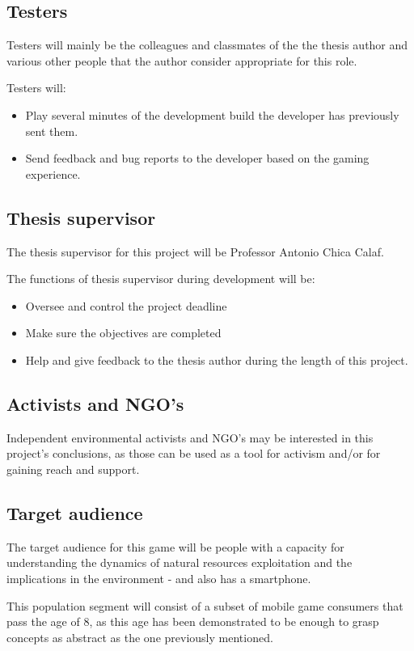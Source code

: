 \subsection{Testers}

Testers will mainly be the colleagues and classmates of the the thesis author and various other people that the author consider appropriate for this role.

Testers will:

\begin{itemize}
\item Play several minutes of the development build the developer has previously sent them.
\item Send feedback and bug reports to the developer based on the gaming experience. 
\end{itemize}

\subsection{Thesis supervisor}

The thesis supervisor for this project will be Professor Antonio Chica Calaf.

The functions of thesis supervisor during development will be:

\begin{itemize}
\item Oversee and control the project deadline
\item Make sure the objectives are completed
\item Help and give feedback to the thesis author during the length of this project.
\end{itemize}

\subsection{Activists and NGO's}

Independent environmental activists and NGO's may be interested in this project's conclusions, as those can be used as a tool for activism and/or for gaining reach and support. 

\subsection{Target audience}

The target audience for this game will be people with a capacity for understanding the dynamics of natural resources exploitation and the implications in the environment - and also has a smartphone.

This population segment will consist of a subset of mobile game consumers that pass the age of 8, as this age has been demonstrated
\cite{childdevelopment}
to be enough to grasp concepts as abstract as the one previously mentioned.


